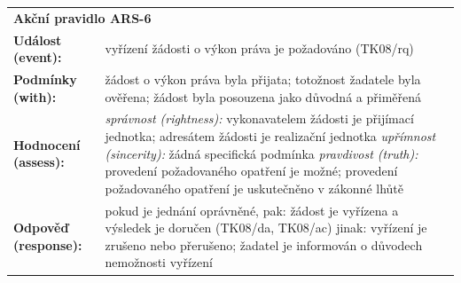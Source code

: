 \begin{itemize}
    \begin{center}
      \renewcommand{\arraystretch}{1.3}
      \begin{tabular}{p{4cm} p{8cm}}
      \multicolumn{2}{l}{\textbf{Akční pravidlo ARS-6}} \\
      \textbf{Událost (event):} & vyřízení žádosti o výkon práva je požadováno (TK08/rq) \\
      \textbf{Podmínky (with):} & 
        žádost o výkon práva byla přijata; \newline
        totožnost žadatele byla ověřena; \newline
        žádost byla posouzena jako důvodná a přiměřená \\
      \textbf{Hodnocení (assess):} & 
        \textit{správnost (rightness):} \newline
        \quad vykonavatelem žádosti je přijímací jednotka; \newline
        \quad adresátem žádosti je realizační jednotka \newline
        \textit{upřímnost (sincerity):} \newline
        \quad žádná specifická podmínka \newline
        \textit{pravdivost (truth):} \newline
        \quad provedení požadovaného opatření je možné; \newline
        \quad provedení požadovaného opatření je uskutečněno v zákonné lhůtě \\
      \textbf{Odpověď (response):} & 
        pokud je jednání oprávněné, pak: \newline
        \quad žádost je vyřízena a výsledek je doručen (TK08/da, TK08/ac) \newline
        jinak: \newline
        \quad vyřízení je zrušeno nebo přerušeno; \newline
        \quad žadatel je informován o důvodech nemožnosti vyřízení \\
      \end{tabular}
    \end{center}


\end{itemize}
